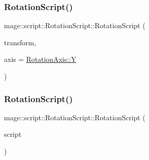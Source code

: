 \subsubsection{\texorpdfstring{Rotation\+Script()}{RotationScript()}\hspace{0.1cm}{\footnotesize\ttfamily [1/3]}}
{\footnotesize\ttfamily mage\+::script\+::\+Rotation\+Script\+::\+Rotation\+Script (\begin{DoxyParamCaption}\item[{\hyperlink{classmage_1_1_transform_node}{Transform\+Node} $\ast$}]{transform,  }\item[{\hyperlink{classmage_1_1script_1_1_rotation_script_aa8a91cc8c771fc777ffb5e8a28c43ad2}{Rotation\+Axis}}]{axis = {\ttfamily \hyperlink{classmage_1_1script_1_1_rotation_script_aa8a91cc8c771fc777ffb5e8a28c43ad2a57cec4137b614c87cb4e24a3d003a3e0}{Rotation\+Axis\+::Y}} }\end{DoxyParamCaption})}

\hypertarget{classmage_1_1script_1_1_rotation_script_a6664052bafe09a6a09734f66d9a68fe9}{}\label{classmage_1_1script_1_1_rotation_script_a6664052bafe09a6a09734f66d9a68fe9} 
\subsubsection{\texorpdfstring{Rotation\+Script()}{RotationScript()}\hspace{0.1cm}{\footnotesize\ttfamily [2/3]}}
{\footnotesize\ttfamily mage\+::script\+::\+Rotation\+Script\+::\+Rotation\+Script (\begin{DoxyParamCaption}\item[{const \hyperlink{classmage_1_1script_1_1_rotation_script}{Rotation\+Script} \&}]{script }\end{DoxyParamCaption})\hspace{0.3cm}{\ttfamily [delete]}}

\hypertarget{classmage_1_1script_1_1_rotation_script_af7391c2e1495efa1b913df7a77a97e15}{}\label{classmage_1_1script_1_1_rotation_script_af7391c2e1495efa1b913df7a77a97e15} 
